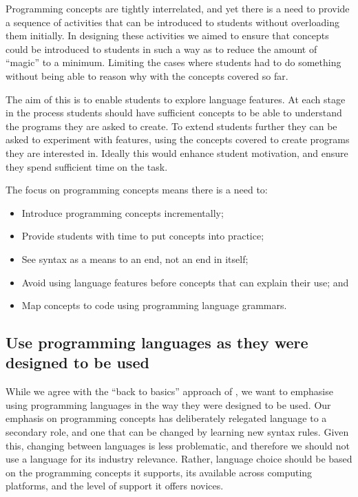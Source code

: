 Programming concepts are tightly interrelated, and yet there is a need to provide a sequence of activities that can be introduced to students without overloading them initially. In designing these activities we aimed to ensure that concepts could be introduced to students in such a way as to reduce the amount of ``magic'' to a minimum. Limiting the cases where students had to do something without being able to reason why with the concepts covered so far.

The aim of this is to enable students to explore language features. At each stage in the process students should have sufficient concepts to be able to understand the programs they are asked to create. To extend students further they can be asked to experiment with features, using the concepts covered to create programs they are interested in. Ideally this would enhance student motivation, and ensure they spend sufficient time on the task.

The focus on programming concepts means there is a need to: %
\begin{itemize}[noitemsep,nolistsep]
	\item Introduce programming concepts incrementally;
	\item Provide students with time to put concepts into practice;
	\item See syntax as a means to an end, not an end in itself;
	\item Avoid using language features before concepts that can explain their use; and
	\item Map concepts to code using programming language grammars.
\end{itemize} 


\subsection{Use programming languages as they were designed to be used} %
\label{ssub:use_programming_languages_as_they_were_designed_to_be_used}

While we agree with the ``back to basics'' approach of \citet{Reges:2006}, we want to emphasise using programming languages in the way they were designed to be used. Our emphasis on programming concepts has deliberately relegated language to a secondary role, and one that can be changed by learning new syntax rules. Given this, changing between languages is less problematic, and therefore we should not use a language for its industry relevance. Rather, language choice should be based on the programming concepts it supports, its available across computing platforms, and the level of support it offers novices.

